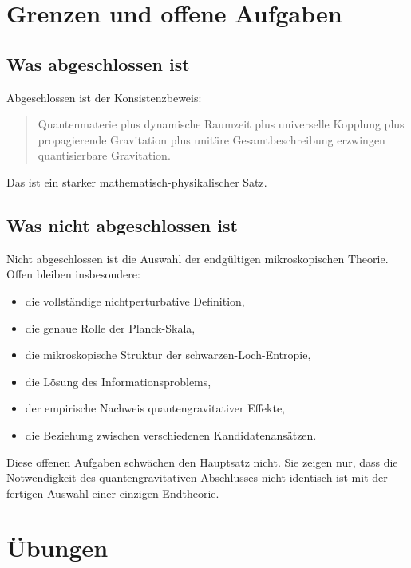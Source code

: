\documentclass[11pt,a4paper]{book}
\theoremstyle{remark}
\begin{document}
\chapter{Grenzen und offene Aufgaben}
\section{Was abgeschlossen ist}
Abgeschlossen ist der Konsistenzbeweis:

\begin{quote}
Quantenmaterie plus dynamische Raumzeit plus universelle Kopplung plus propagierende Gravitation plus unitäre Gesamtbeschreibung erzwingen quantisierbare Gravitation.
\end{quote}

Das ist ein starker mathematisch-physikalischer Satz.

\section{Was nicht abgeschlossen ist}
Nicht abgeschlossen ist die Auswahl der endgültigen mikroskopischen Theorie. Offen bleiben insbesondere:

\begin{itemize}
\item die vollständige nichtperturbative Definition,
\item die genaue Rolle der Planck-Skala,
\item die mikroskopische Struktur der schwarzen-Loch-Entropie,
\item die Lösung des Informationsproblems,
\item der empirische Nachweis quantengravitativer Effekte,
\item die Beziehung zwischen verschiedenen Kandidatenansätzen.
\end{itemize}

Diese offenen Aufgaben schwächen den Hauptsatz nicht. Sie zeigen nur, dass die Notwendigkeit des quantengravitativen Abschlusses nicht identisch ist mit der fertigen Auswahl einer einzigen Endtheorie.

\chapter{Übungen}
\end{document}

